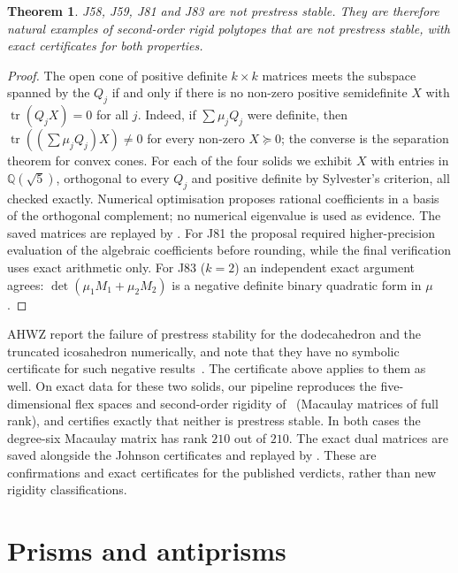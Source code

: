 \documentclass[11pt]{amsart}
\newtheorem{theorem}{Theorem}[section]
\theoremstyle{remark}
\newcommand{\Q}{\mathbb Q}
\begin{document}
\begin{theorem}\label{thm:prestress}
J58, J59, J81 and J83 are not prestress stable. They are therefore natural examples of second-order rigid polytopes that are not prestress stable, with exact certificates for both properties.
\end{theorem}

\begin{proof}
The open cone of positive definite $k\times k$ matrices meets the subspace spanned by the $Q_j$ if and only if there is no non-zero positive semidefinite $X$ with $\operatorname{tr}(Q_jX)=0$ for all $j$. Indeed, if $\sum\mu_jQ_j$ were definite, then $\operatorname{tr}((\sum\mu_jQ_j)X)\neq0$ for every non-zero $X\succeq0$; the converse is the separation theorem for convex cones. For each of the four solids we exhibit $X$ with entries in $\Q(\sqrt5)$, orthogonal to every $Q_j$ and positive definite by Sylvester's criterion, all checked exactly. Numerical optimisation proposes rational coefficients in a basis of the orthogonal complement; no numerical eigenvalue is used as evidence. The saved matrices are replayed by . For J81 the proposal required higher-precision evaluation of the algebraic coefficients before rounding, while the final verification uses exact arithmetic only. For J83 ($k=2$) an independent exact argument agrees: $\det(\mu_1M_1+\mu_2M_2)$ is a negative definite binary quadratic form in $\mu$.
\end{proof}

AHWZ report the failure of prestress stability for the dodecahedron and the truncated icosahedron numerically, and note that they have no symbolic certificate for such negative results~\cite[Sec.~8]{AHWZ2026}. The certificate above applies to them as well. On exact data for these two solids, our pipeline reproduces the five-dimensional flex spaces and second-order rigidity of~\cite{AHWZ2026} (Macaulay matrices of full rank), and certifies exactly that neither is prestress stable. In both cases the degree-six Macaulay matrix has rank $210$ out of $210$. The exact dual matrices are saved alongside the Johnson certificates and replayed by . These are confirmations and exact certificates for the published verdicts, rather than new rigidity classifications.

\section{Prisms and antiprisms}\label{sec:anti}
\end{document}
